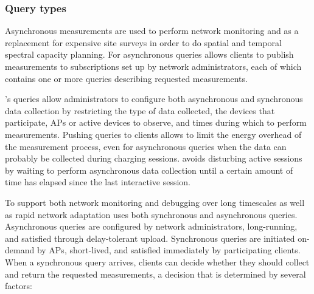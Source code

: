 \subsubsection{Query types}

Asynchronous measurements are used to perform network monitoring and as a
replacement for expensive site surveys in order to do spatial and temporal
spectral capacity planning. For asynchronous queries \PS{} allows clients to
publish measurements to subscriptions set up by network administrators, each
of which contains one or more queries describing requested measurements.

\PS{}'s queries allow administrators to configure both asynchronous and
synchronous data collection by restricting the type of data collected, the
devices that participate, APs or active devices to observe, and times during
which to perform measurements. Pushing queries to clients allows \PS{} to
limit the energy overhead of the measurement process, even for asynchronous
queries when the data can probably be collected during charging sessions.
\PS{} avoids disturbing active sessions by waiting to perform asynchronous
data collection until a certain amount of time has elapsed since the last
interactive session.

To support both network monitoring and debugging over long timescales as well
as rapid network adaptation \PS{} uses both synchronous and asynchronous
queries. Asynchronous queries are configured by network administrators,
long-running, and satisfied through delay-tolerant upload. Synchronous
queries are initiated on-demand by APs, short-lived, and satisfied
immediately by participating clients. When a synchronous query arrives,
\PS{} clients can decide whether they should collect and return the requested
measurements, a decision that is determined by several factors:

